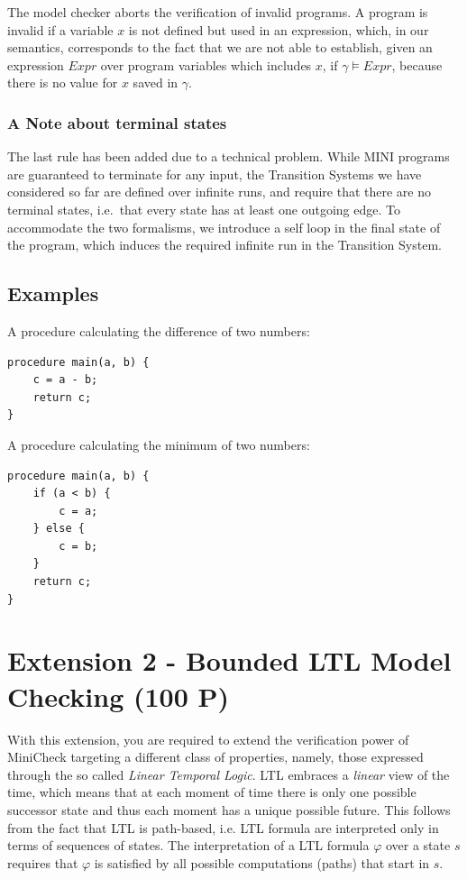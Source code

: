 \documentclass{article}
\begin{document}
The model checker aborts the verification of invalid programs. A program is invalid if a variable $x$ is not defined but used in an expression, which, in our semantics, corresponds to the fact that we are not able to establish, given an expression $Expr$ over program variables which includes $x$, if $\gamma \vDash Expr$, because there is no value for $x$ saved in $\gamma$.

\subsubsection*{A Note about terminal states}
The last rule has been added due to a technical problem. While MINI programs are guaranteed to terminate for any input, the Transition Systems we have considered so far are defined over infinite runs, and require that there are no terminal states, i.e.~that every state has at least one outgoing edge. To accommodate the two formalisms, we introduce a self loop in the final state of the program, which induces the required infinite run in the Transition System.

\subsection{Examples}

A procedure calculating the difference of two numbers:
\begin{lstlisting}
procedure main(a, b) {
    c = a - b;
    return c;
}
\end{lstlisting}

A procedure calculating the minimum of two numbers:
\begin{lstlisting}
procedure main(a, b) {
    if (a < b) {
        c = a;
    } else {
        c = b;
    }
    return c;
}
\end{lstlisting}


\section{Extension 2 - Bounded LTL Model Checking (100 P)}
\label{sec:ext2}
With this extension, you are required to extend the verification power of MiniCheck targeting a different class of properties, namely, those expressed through the so called \emph{Linear Temporal Logic}. LTL embraces a \emph{linear} view of the time, which means that at each moment of time there is only one possible successor state and thus each moment has a unique possible future. This follows from the fact that LTL is path-based, i.e. LTL formula are interpreted only in terms of sequences of states. The interpretation of a LTL formula $\varphi$ over a state $s$ requires that $\varphi$ is satisfied by all possible computations (paths) that start in $s$.
\end{document}
